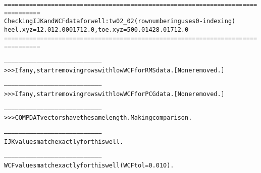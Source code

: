 \begin{alltt}
================================================================================
Checking IJK and WCF data for well: tw02_02 (row numbering uses 0-indexing)
heel.xyz =  12.0 12.000 1712.0, toe.xyz = 500.0 1428.0 1712.0
================================================================================

--------------------------------------------------------------------------------
>>> If any, start removing rows with low WCF for RMS data. [None removed.]

--------------------------------------------------------------------------------
>>> If any, start removing rows with low WCF for PCG data. [None removed.]

--------------------------------------------------------------------------------
>>> COMPDAT vectors have the same length. Making comparison.

--------------------------------------------------------------------------------
IJK values match exactly for this well.

--------------------------------------------------------------------------------
WCF values match exactly for this well (WCF tol = 0.010).
\end{alltt}
